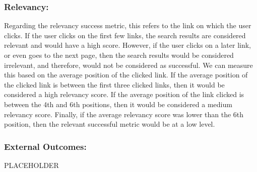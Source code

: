 \smallskip\subsubsection*{Relevancy:}
Regarding the relevancy success metric, this refers to the link on which the user 
clicks. If the user clicks on the first few links, the search results are 
considered relevant and would have a high score. However, if the user clicks on a 
later link, or even goes to the next page, then the search results would be 
considered irrelevant, and therefore, would not be considered as successful. We 
can measure this based on the average position of the clicked link. If the average 
position of the clicked link is between the first three clicked links, then it 
would be considered a high relevancy score. If the average position of the link 
clicked is between the 4th and 6th positions, then it would be considered a medium 
relevancy score. Finally, if the average relevancy score was lower than the 6th 
position, then the relevant successful metric would be at a low level.

\subsubsection*{External Outcomes:}
PLACEHOLDER
